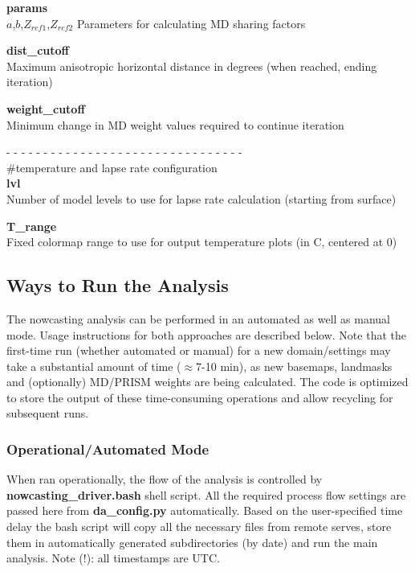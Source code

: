 \documentclass{article}
\begin{document}
\noindent \textbf{params}\\
$a$,$b$,$Z_{ref1}$,$Z_{ref2}$ Parameters for calculating MD sharing factors

\vspace{0.1cm}
\noindent \textbf{dist\_cutoff}\\
Maximum anisotropic horizontal distance in degrees (when reached, ending iteration)

\vspace{0.1cm}
\noindent \textbf{weight\_cutoff}\\
Minimum change in MD weight values required to continue iteration


\vspace{0.5cm}
\noindent- - - - - - - - - - - - - - - - - - - - - - - - - - - - - - - -\\
\noindent\#temperature and lapse rate configuration\\

\noindent \textbf{lvl}\\
Number of model levels to use for lapse rate calculation (starting from surface)

\vspace{0.1cm}
\noindent \textbf{T\_range}\\
Fixed colormap range to use for output temperature plots (in C, centered at 0)


\subsection{Ways to Run the Analysis}\label{sec:run}
The nowcasting analysis can be performed in an automated as well as manual mode. Usage instructions for both approaches are described below. Note that the first-time run (whether automated or manual) for a new domain/settings may take a substantial amount of time ($\approx$7-10 min), as new basemaps, landmasks and (optionally) MD/PRISM weights are being calculated. The code is optimized to store the output of these time-consuming operations and allow recycling for subsequent runs. 

\subsubsection{Operational/Automated Mode}
When ran operationally, the flow of the analysis is controlled by \textbf{nowcasting\_driver.bash} shell script. All the required process flow settings are passed here from \textbf{da\_config.py} automatically. Based on the user-specified time delay the bash script will copy all the necessary files from remote serves, store them in automatically generated subdirectories (by date) and run the main analysis. Note (!): all timestamps are UTC. \\
\end{document}

